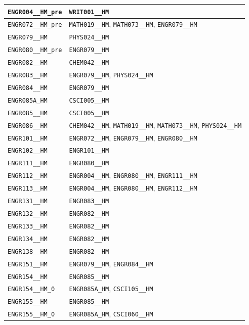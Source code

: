 \begin{longtable}{|p{4.4in}|p{4.4in}|}
    \verb|ENGR004__HM_pre| & \verb|WRIT001__HM|\\\hline
    \verb|ENGR072__HM_pre| & \verb|MATH019__HM|, \verb|MATH073__HM|, \verb|ENGR079__HM|\\\hline
    \verb|ENGR079__HM| & \verb|PHYS024__HM|\\\hline
    \verb|ENGR080__HM_pre| & \verb|ENGR079__HM|\\\hline
    \verb|ENGR082__HM| & \verb|CHEM042__HM|\\\hline
    \verb|ENGR083__HM| & \verb|ENGR079__HM|, \verb|PHYS024__HM|\\\hline
    \verb|ENGR084__HM| & \verb|ENGR079__HM|\\\hline
    \verb|ENGR085A_HM| & \verb|CSCI005__HM|\\\hline
    \verb|ENGR085__HM| & \verb|CSCI005__HM|\\\hline
    \verb|ENGR086__HM| & \verb|CHEM042__HM|, \verb|MATH019__HM|, \verb|MATH073__HM|, \verb|PHYS024__HM|\\\hline
    \verb|ENGR101__HM| & \verb|ENGR072__HM|, \verb|ENGR079__HM|, \verb|ENGR080__HM|\\\hline
    \verb|ENGR102__HM| & \verb|ENGR101__HM|\\\hline
    \verb|ENGR111__HM| & \verb|ENGR080__HM|\\\hline
    \verb|ENGR112__HM| & \verb|ENGR004__HM|, \verb|ENGR080__HM|, \verb|ENGR111__HM|\\\hline
    \verb|ENGR113__HM| & \verb|ENGR004__HM|, \verb|ENGR080__HM|, \verb|ENGR112__HM|\\\hline
    \verb|ENGR131__HM| & \verb|ENGR083__HM|\\\hline
    \verb|ENGR132__HM| & \verb|ENGR082__HM|\\\hline
    \verb|ENGR133__HM| & \verb|ENGR082__HM|\\\hline
    \verb|ENGR134__HM| & \verb|ENGR082__HM|\\\hline
    \verb|ENGR138__HM| & \verb|ENGR082__HM|\\\hline
    \verb|ENGR151__HM| & \verb|ENGR079__HM|, \verb|ENGR084__HM|\\\hline
    \verb|ENGR154__HM| & \verb|ENGR085__HM|\\\hline
    \verb|ENGR154__HM_0| & \verb|ENGR085A_HM|, \verb|CSCI105__HM|\\\hline
    \verb|ENGR155__HM| & \verb|ENGR085__HM|\\\hline
    \verb|ENGR155__HM_0| & \verb|ENGR085A_HM|, \verb|CSCI060__HM|\\\hline

\end{longtable}
